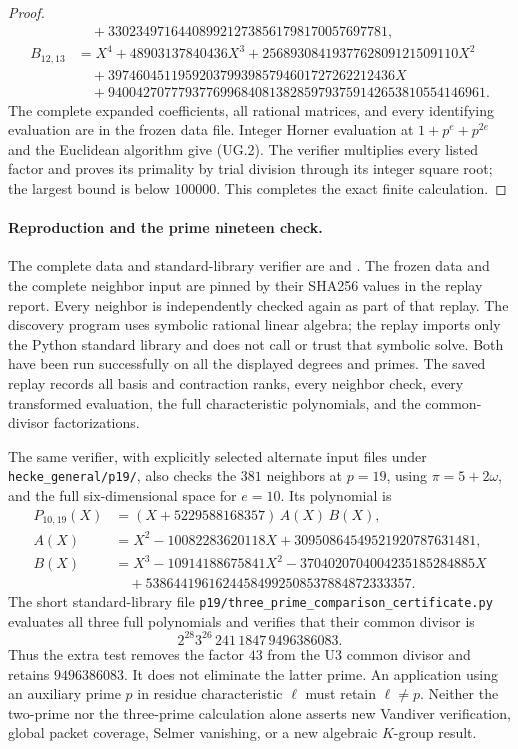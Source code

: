 \begin{proof}
\[\begin{aligned}
          &\quad+3302349716440899212738561798170057697781,\\
 B_{12,13}&=X^4+48903137840436X^3+2568930841937762809121509110X^2\\
          &\quad+39746045119592037993985794601727262212436X\\
          &\quad+940042707779377699684081382859793759142653810554146961.
\end{aligned}
\tag{UG.12}
\]
The complete expanded coefficients, all rational matrices, and
every identifying evaluation are in the frozen data file.
Integer Horner evaluation at $1+p^e+p^{2e}$ and the Euclidean
algorithm give (UG.2). The verifier multiplies every listed
factor and proves its primality by trial division through its
integer square root; the largest bound is below $100000$.
This completes the exact finite calculation.
\end{proof}

\paragraph{Reproduction and the prime nineteen check.}
The complete data and standard-library verifier are
 and
.
The frozen data and the complete neighbor input are pinned by
their SHA256 values in the replay report. Every neighbor is
independently checked again as part of that replay.
The discovery program uses symbolic rational linear algebra;
the replay imports only the Python standard library and does not
call or trust that symbolic solve. Both have been run successfully
on all the displayed degrees and primes. The saved replay records
all basis and contraction ranks, every neighbor check, every
transformed evaluation, the full characteristic polynomials,
and the common-divisor factorizations.

The same verifier, with explicitly selected alternate input files
under \texttt{hecke\_general/p19/}, also checks the $381$ neighbors
at $p=19$, using $\pi=5+2\omega$, and the full six-dimensional
space for $e=10$. Its polynomial is
\[
\begin{aligned}
 P_{10,19}(X)&=(X+5229588168357)\,A(X)\,B(X),\\
 A(X)&=X^2-10082283620118X+30950864549521920787631481,\\
 B(X)&=X^3-10914188675841X^2-3704020704004235185284885X\\
     &\quad+53864419616244584992508537884872333357.
\end{aligned}
\tag{UG.13}
\]
The short standard-library file
\texttt{p19/three\_prime\_comparison\_certificate.py} evaluates all
three full polynomials and verifies that their common divisor is
\[
 2^{28}3^{26}\,241\,1847\,9496386083.
 \tag{UG.14}
\]
Thus the extra test removes the factor $43$ from the U3 common divisor
and retains $9496386083$. It does not eliminate the latter prime.
An application using an auxiliary prime $p$ in residue characteristic
$\ell$ must retain $\ell\ne p$. Neither the two-prime nor the
three-prime calculation alone asserts new Vandiver verification,
global packet coverage, Selmer vanishing, or a new algebraic $K$-group
result.
